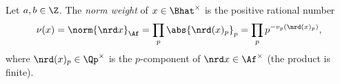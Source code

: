 Let $a,b\in\Z$. The \emph{norm weight} of $x\in\Bhat^\times$ is the positive rational number
\[
  \nu(x)=\norm{\nrd x}_{\Af}=\prod_p\abs{\nrd(x)_p}_p=\prod_p p^{-v_p(\nrd(x)_p)},
\]
where $\nrd(x)_p\in\Qp^\times$ is the $p$-component of $\nrd x\in\Af^\times$ (the product is finite).
